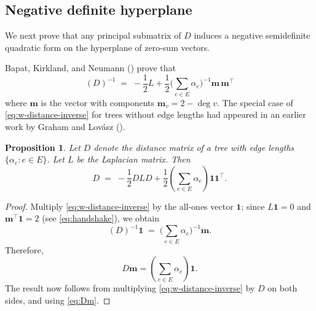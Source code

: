 \documentclass[12pt]{amsart}
\newtheorem{prop}[thm]{Proposition}
\theoremstyle{definition}
\newtheorem{rmk}[thm]{Remark}
\newcommand{\bone}{\mathbf{1}}
\newcommand{\boldm}{\mathbf{m}}
\newcommand{\Da}{{D}}
\newcommand{\La}{L}
\newcommand{\tr}{\intercal}
\begin{document}
\subsection{Negative definite hyperplane}

We next prove that any principal submatrix of $D$ induces a negative semidefinite quadratic form on the hyperplane of zero-sum vectors.

Bapat, Kirkland, and Neumann (\cite[Theorem 2.1]{bapat-kirkland-neumann}) prove that
\begin{equation}
\label{eq:w-distance-inverse}
	(\Da)^{-1} \;=\; - \frac12 \La + \frac12 \Big( \sum_{e \in E} \alpha_e\Big)^{-1} \boldm\, \boldm^\tr
\end{equation}
where $\boldm$ is the vector with components $\boldm_v = 2 - \deg v$.
The special case of \eqref{eq:w-distance-inverse} for trees without edge lengths had appeared in an earlier work by Graham and Lov\'asz (\cite[Lemma 1]{graham-lovasz}).


\begin{prop}
\label{prop:dist-laplacian}
Let $D$ denote the distance matrix of a tree with edge lengths $\{\alpha_e \colon e \in E\}$. Let $\La$ be the Laplacian matrix. 
Then
\[
	\Da \;=\; - \frac{1}{2} \Da \La \Da + \frac{1}{2} \left( \sum_{e \in E} \alpha_e\right) \bone \bone^\tr .
\]
\end{prop}
\begin{proof}
Multiply \eqref{eq:w-distance-inverse} by the all-ones vector $\bone$; since $\La \bone = 0$ and $\boldm^\tr \bone = 2$ (see \eqref{eq:handshake}), we obtain 
\[
(\Da)^{-1} \bone \;=\; \Big( \sum_{e \in E} \alpha_e\Big)^{-1} \boldm .
\]
Therefore, 
\begin{equation}\label{eq:Dm}
\Da \boldm = \left( \sum_{e \in E} \alpha_e \right) \bone .
\end{equation}
The result now follows from multiplying \eqref{eq:w-distance-inverse} by $\Da$ on both sides, and using \eqref{eq:Dm}. 
\end{proof}
\end{document}
